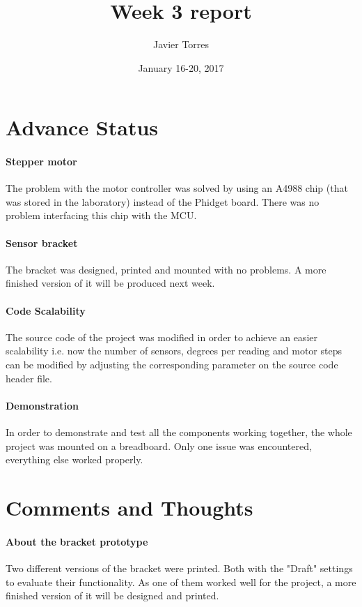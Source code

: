 \documentclass{article}
\title{Week 3 report}
\author{Javier Torres}
\date{January 16-20, 2017}
\begin{document}
\maketitle

\tableofcontents

\section{Advance Status}

\paragraph{Stepper motor}
The problem with the motor controller was solved by using an A4988 chip (that was stored in the laboratory) instead of the Phidget board. There was no problem interfacing this chip with the MCU.

\paragraph{Sensor bracket}
The bracket was designed, printed and mounted with no problems. A more finished version of it will be produced next week.

\paragraph{Code Scalability}
The source code of the project was modified in order to achieve an easier scalability i.e. now the number of sensors, degrees per reading and motor steps can be modified by adjusting the corresponding parameter on the source code header file.

\paragraph{Demonstration}
In order to demonstrate and test all the components working together, the whole project was mounted on a breadboard. Only one issue was encountered, everything else worked properly.

\section{Comments and Thoughts}

\paragraph{About the bracket prototype}
Two different versions of the bracket were printed. Both with the "Draft" settings to evaluate their functionality. As one of them worked well for the project, a more finished version of it will be designed and printed.
\end{document}
